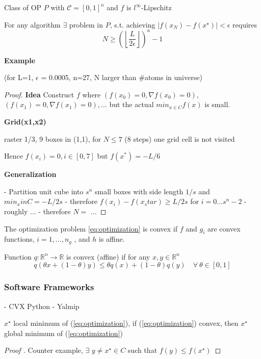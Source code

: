 Class of OP $P$ with $\mathcal{C}=[0,1]^n$
and $f$ is $l^\infty$-Lipschitz

\begin{proposition}
	For any algorithm $\exists$ problem in $P$,
	s.t. achieving $|f(x_N )−f(x^⋆)| < \epsilon$
	requires
	$$N \ge \left(\left\lfloor\frac{L}{2\epsilon}\right\rfloor\right)^n-1$$
\end{proposition}

\textbf{Example}

(for L=1, $\epsilon$ = 0.0005, n=27, N larger than \#atoms in universe)

\begin{proof}[Proof]
	\textbf{Idea}
	Construct $f$ where $(f(x_0) = 0,\nabla f(x_0) = 0)$, $(f(x_1) = 0,\nabla f(x_1) = 0),...$ but the actual $min_{x \in C}f(x)$ is small.

	\textbf{Grid(x1,x2)}

	raster 1/3, 9 boxes in (1,1), for $N\le 7$ (8 steps) one grid cell is not visited

	Hence $f(x_i) = 0, i \in [0,7]$ but $f(x^*) = -L/6$

	\textbf{Generalization}

	- Partition unit cube into $s^n$ small boxes with side length $1/s$ and $min_xinC = -L/2s$
	- therefore $f(x_i)-f(x_star) \ge L/2s$ for $i=0...s^n-2$
	- roughly ...
	- therefore $N=$ ...

\end{proof}

\begin{definition}[]
	The optimization problem \ref{eq:optimization} is convex
	if $f$ and $g_i$ are convex functions,
	$i = 1, . . . , n_g$ ,
	and $h$ is affine.
\end{definition}

\begin{definition}[]
	Function $q: \mathbb{R}^{n}\rightarrow\mathbb{R}$
	is convex (affine)
	if for any $x, y \in \mathbb{R}^{n}$
	$$
		q(\theta x+(1 − \theta)y) \le \theta q(x) + (1 − \theta)q(y)\quad\forall\ \theta \in [0, 1]
	$$
\end{definition}

\subsubsection{Software Frameworks}

- CVX Python
- Yalmip

\begin{proposition}
	$x^\star$ local minimum of (\ref{eq:optimization}),
	if (\ref{eq:optimization}) convex,
	then $x^\star$ global minimum of (\ref{eq:optimization})
\end{proposition}


\begin{proof}[Proof ]
	Counter example, $\exists$ $y\ne x^\star \in C$ such that $f(y)\le f(x^\star)$
\end{proof}

